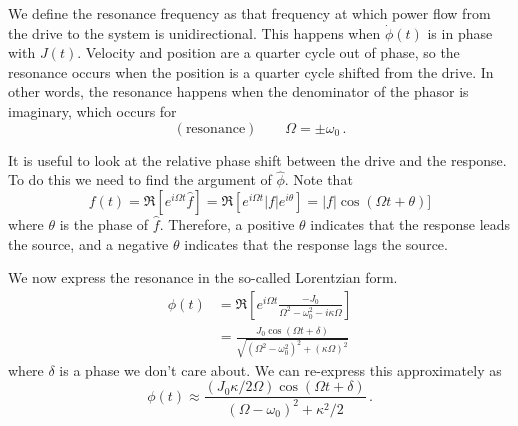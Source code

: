 
We define the resonance frequency as that frequency at which power flow from the drive to the system is unidirectional.
This happens when $\dot{\phi}(t)$ is in phase with $J(t)$.
Velocity and position are a quarter cycle out of phase, so the resonance occurs when the position is a quarter cycle shifted from the drive.
In other words, the resonance happens when the denominator of the phasor is imaginary, which occurs for
\begin{equation}
(\text{resonance}) \qquad \Omega = \pm \omega_0 \, .
\end{equation}


It is useful to look at the relative phase shift between the drive and the response.
To do this we need to find the argument of $\hat{\phi}$.
Note that
\begin{equation}
f(t)
= \Re[e^{i \Omega t}\hat{f}]
= \Re[e^{i \Omega t}|f|e^{i\theta}]
=|f|\cos(\Omega t + \theta)]
\end{equation}
where $\theta$ is the phase of $\hat{f}$.
Therefore, a positive $\theta$ indicates that the response leads the source, and a negative $\theta$ indicates that the response lags the source.


We now express the resonance in the so-called Lorentzian form.
\begin{align}
  \phi(t)
  &= \Re \left[ e^{i\Omega t} \frac{-J_0}{\Omega^2 - \omega_0^2 - i \kappa \Omega} \right] \nonumber \\
  &= \frac{J_0 \cos \left( \Omega t + \delta \right)}{\sqrt{\left( \Omega^2 - \omega_0^2 \right)^2 + (\kappa \Omega)^2}}
\end{align}
where $\delta$ is a phase we don't care about.
We can re-express this approximately as
\begin{equation}
\phi(t) \approx \frac{(J_0 \kappa / 2 \Omega) \cos(\Omega t + \delta)}{\left( \Omega - \omega_0 \right)^2 + \kappa^2 / 2} \, .
\end{equation}
